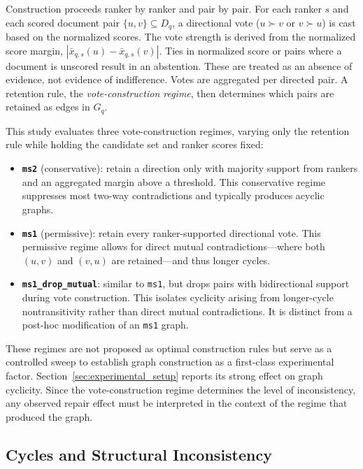 \documentclass[pdflatex,sn-basic,Numbered]{sn-jnl}
\begin{document}
Construction proceeds ranker by ranker and pair by pair. For each ranker $s$
and each scored document pair $\{u,v\} \subseteq D_q$, a directional vote
($u \succ v$ or $v \succ u$) is cast based on the normalized scores. The vote
strength is derived from the normalized score margin,
$|\bar{x}_{q,s}(u) - \bar{x}_{q,s}(v)|$. Ties in normalized score or pairs
where a document is unscored result in an abstention. These are treated as
an absence of evidence, not evidence of indifference. Votes are aggregated
per directed pair. A retention rule, the \emph{vote-construction regime},
then determines which pairs are retained as edges in $G_q$.

This study evaluates three vote-construction regimes, varying only the
retention rule while holding the candidate set and ranker scores fixed:
\begin{itemize}
  \item \textbf{\texttt{ms2}} (conservative): retain a direction only with
    majority support from rankers and an aggregated margin above a
    threshold. This conservative regime suppresses most two-way
    contradictions and typically produces acyclic graphs.
  \item \textbf{\texttt{ms1}} (permissive): retain every ranker-supported
    directional vote. This permissive regime allows for direct mutual
    contradictions—where both $(u,v)$ and $(v,u)$ are retained—and thus
    longer cycles.
  \item \textbf{\texttt{ms1\_drop\_mutual}}: similar to \texttt{ms1}, but
    drops pairs with bidirectional support during vote construction. This
    isolates cyclicity arising from longer-cycle nontransitivity rather
    than direct mutual contradictions. It is distinct from a post-hoc
    modification of an \texttt{ms1} graph.
\end{itemize}
These regimes are not proposed as optimal construction rules but serve as a
controlled sweep to establish graph construction as a first-class
experimental factor. Section~\ref{sec:experimental_setup} reports its strong
effect on graph cyclicity. Since the vote-construction regime determines
the level of inconsistency, any observed repair effect must be interpreted
in the context of the regime that produced the graph.

\subsection{Cycles and Structural Inconsistency}
\label{sec:cycles}
\end{document}
